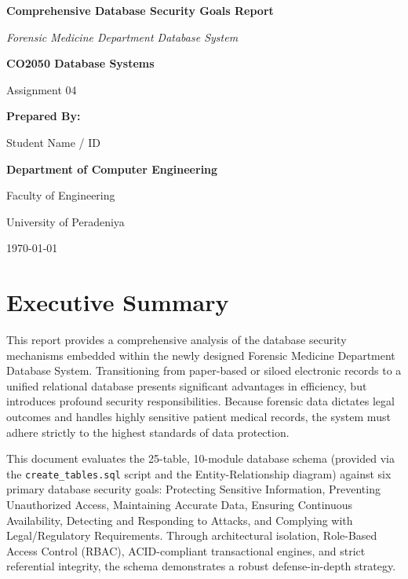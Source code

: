 \documentclass[12pt,a4paper]{article}
\begin{document}
\begin{titlepage}
    \centering
    \vspace*{2cm}
    
    {\Huge\bfseries Comprehensive Database Security Goals Report\par}
    \vspace{1.5cm}
    {\Large\itshape Forensic Medicine Department Database System\par}
    \vspace{2cm}
    
    {\Large\bfseries CO2050 Database Systems\par}
    {\Large Assignment 04\par}
    \vspace{2cm}
    
    \textbf{Prepared By:}\par
    Student Name / ID
    \vspace{1.5cm}
    
    \textbf{Department of Computer Engineering}\par
    Faculty of Engineering\par
    University of Peradeniya\par
    
    \vfill
    {\large \today\par}
\end{titlepage}

\newpage
\tableofcontents
\newpage

\section{Executive Summary}
This report provides a comprehensive analysis of the database security mechanisms embedded within the newly designed Forensic Medicine Department Database System. Transitioning from paper-based or siloed electronic records to a unified relational database presents significant advantages in efficiency, but introduces profound security responsibilities. Because forensic data dictates legal outcomes and handles highly sensitive patient medical records, the system must adhere strictly to the highest standards of data protection.

This document evaluates the 25-table, 10-module database schema (provided via the \texttt{create\_tables.sql} script and the Entity-Relationship diagram) against six primary database security goals: Protecting Sensitive Information, Preventing Unauthorized Access, Maintaining Accurate Data, Ensuring Continuous Availability, Detecting and Responding to Attacks, and Complying with Legal/Regulatory Requirements. Through architectural isolation, Role-Based Access Control (RBAC), ACID-compliant transactional engines, and strict referential integrity, the schema demonstrates a robust defense-in-depth strategy.
\end{document}
